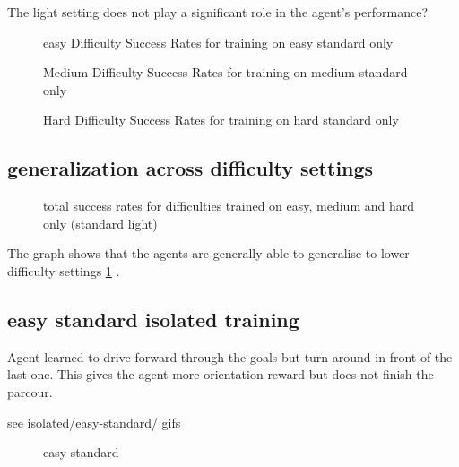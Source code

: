The light setting does not play a significant role in the agent's performance?

\begin{figure}
    \centering
    \caption{easy Difficulty Success Rates for training on easy standard only}
\end{figure}

\begin{figure}
    \centering
    \caption{Medium Difficulty Success Rates for training on medium standard only}
\end{figure}

\begin{figure}
    \centering
    \caption{Hard Difficulty Success Rates for training on hard standard only}
\end{figure}



\subsection{generalization across difficulty settings}

\begin{figure}
    \centering
    \caption{total success rates for difficulties trained on easy, medium and hard only (standard light)}
    \label{fig:isolated_all_difficulties}
\end{figure}

The graph shows that the agents are generally able to generalise to lower difficulty settings \ref{fig:isolated_all_difficulties} .



\subsection{easy standard isolated training}

Agent learned to drive forward through the goals but turn around in front of the last one.
This gives the agent more orientation reward but does not finish the parcour.

see isolated/easy-standard/ gifs

\begin{figure}
    \centering
    \caption{easy standard}
    \label{fig:isolated_easy_standard}
\end{figure}


